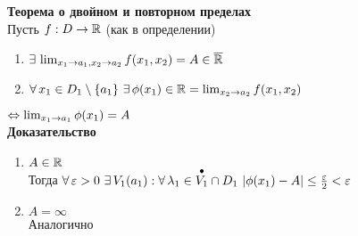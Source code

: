 \documentclass[12pt]{article}
\begin{document}
\textbf{Теорема о двойном и повторном пределах}\\
Пусть $f: D \rightarrow \mathbb{R}$ (как в определении)
\begin{enumerate}
    \item $\exists\, \lim_{x_1\rightarrow a_1, x_2 \rightarrow a_2} f(x_1, x_2) = A \in \overline{\mathbb{R}}$
    \item $\fall x_1 \in D_1\setminus \{a_1\}\ \ex \phi(x_1) \in \Rset = \lim_{x_2 \rto a_2} f(x_1, x_2)$
\end{enumerate}
$\Leftrightarrow \lim_{x_1 \rightarrow a_1} \phi(x_1) = A$\\
\textbf{Доказательство}
\begin{enumerate}
    \item $A \in \mathbb{R}$\\
    Тогда $\forall\, \varepsilon > 0\ \exists\, V_1(a_1): \forall\, \lambda_1 \in \overset{\bullet}{V_1}\cap D_1\ |\phi(x_1) - A| \leq \frac{\varepsilon}2 < \varepsilon$
    \item $A = \infty$\\
    Аналогично
\end{enumerate}
\end{document}
